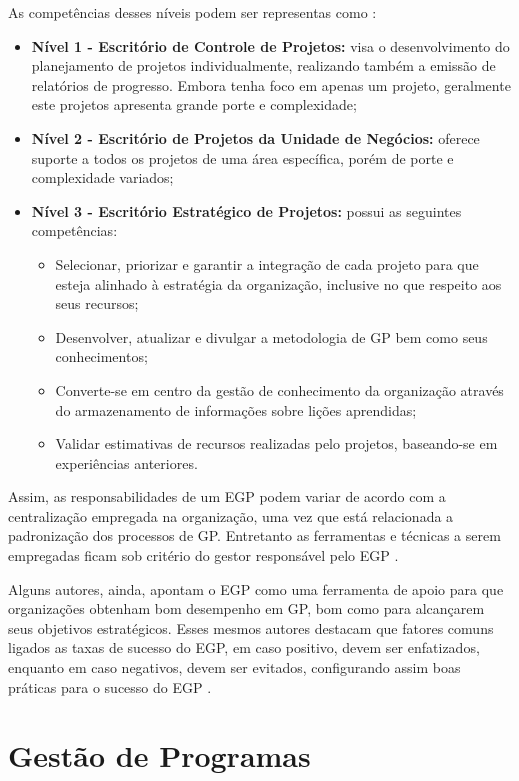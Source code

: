 As competências desses níveis podem ser representas como \cite{crawford2010strategic}:

\begin{itemize}
  \item \textbf{Nível 1 - Escritório de Controle de Projetos:} visa o desenvolvimento do planejamento de projetos individualmente, realizando também a emissão de relatórios de progresso. Embora tenha foco em apenas um projeto, geralmente este projetos apresenta grande porte e complexidade;
  \item \textbf{Nível 2 - Escritório de Projetos da Unidade de Negócios:} oferece suporte a todos os projetos de uma área específica, porém de porte e complexidade variados;
  \item \textbf{Nível 3 - Escritório Estratégico de Projetos:} possui as seguintes competências:
  \begin{itemize}
    \item Selecionar, priorizar e garantir a integração de cada projeto para que esteja alinhado à estratégia da organização, inclusive no que respeito aos seus recursos;
    \item Desenvolver, atualizar e divulgar a metodologia de GP bem como seus conhecimentos;
    \item Converte-se em centro da gestão de conhecimento da organização através do armazenamento de informações sobre lições aprendidas;
    \item Validar estimativas de recursos realizadas pelo projetos, baseando-se em experiências anteriores.
  \end{itemize}
\end{itemize}

Assim, as responsabilidades de um EGP podem variar de acordo com a centralização empregada na organização, uma vez que está relacionada a padronização dos processos de GP. Entretanto as ferramentas e técnicas a serem empregadas ficam sob critério do gestor responsável pelo EGP \cite{pmiguide2014}.

Alguns autores, ainda, apontam o EGP como uma ferramenta de apoio para que organizações obtenham bom desempenho em GP, bom como para alcançarem seus objetivos estratégicos. Esses mesmos autores destacam que fatores comuns ligados as taxas de sucesso do EGP, em caso positivo, devem ser enfatizados, enquanto em caso negativos, devem ser evitados, configurando assim boas práticas para o sucesso do EGP \cite{andersen2007benchmarking}.


\section{Gestão de Programas}

